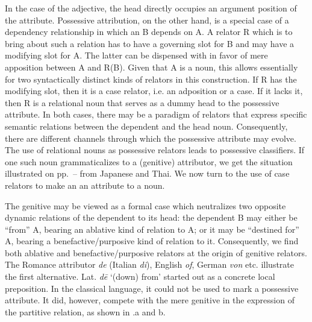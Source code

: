 In the case of the adjective, the head directly occupies an argument position of the attribute. Possessive attribution, on the other hand, is a special case of a dependency relationship in which an \np B depends on A.\label{page78} A relator R which is to bring about such a relation has to have a governing slot for B and may have a modifying slot for A. The latter can be dispensed with in favor of mere apposition between A and R(B). Given that A is a noun, this allows essentially for two syntactically distinct kinds of relators in this construction. If R has the modifying slot, then it is a case relator, i.e. an adposition or a case. If it lacks it, then R is a relational noun that serves as a dummy head to the possessive attribute. In both cases, there may be a paradigm of relators that express specific semantic relations between the dependent \np and the head noun. Consequently, there are different channels through which the possessive attribute may evolve. The use of relational nouns as possessive relators leads to possessive classifiers. If one such noun grammaticalizes to a (genitive) attributor, we get the situation illustrated on pp.~\pageref{page74b}--\pageref{page75}\chk%
  from Japanese and Thai. We now turn to the use of case relators to make an \np an attribute to a noun.

The genitive may be viewed as a formal case which neutralizes two opposite dynamic relations of the dependent \np to its head: the dependent B may either be “from” A, bearing an ablative kind of relation to A; or it may be “destined for” A, bearing a benefactive/purposive kind of relation to it. Consequently, we find both ablative and benefactive/purposive relators at the origin of genitive relators.\label{page78b} The Romance attributor \textit{de} (Italian \textit{di}), English \textit{of}, German \textit{von} etc. illustrate the first alternative. Lat. \textit{d\=e} ‘(down) from’ started out as a concrete local preposition. In the classical language, it could not be used to mark a possessive attribute. It did, however, compete with the mere genitive in the expression of the partitive relation, as shown in .a and b.

